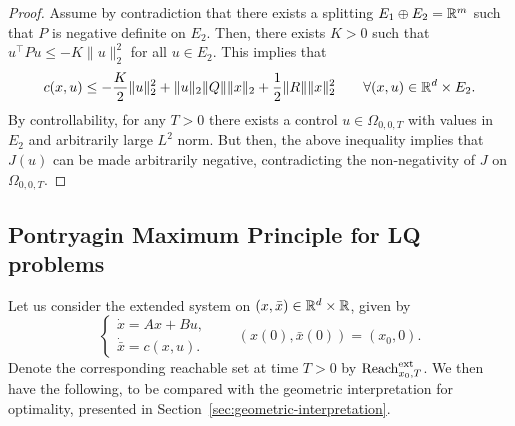 \begin{proof}
    Assume by contradiction that there exists a splitting $E_1\oplus E_2 = \mathbb{R}^m$ such that $P$ is negative definite on $E_2$.
    Then, there exists $K>0$ such that $u^\top P u \le -K \|u\|_2^2$ for all $u\in E_2$.
    This implies that 
    \begin{equation}
        c(x,u) \le -\frac{K}2 \|u\|_2^2 + \|u\|_2\|Q\|\|x\|_2 + \frac12 \|R\|\|x\|_2^2 \qquad \forall (x,u)\in \mathbb{R}^d\times E_2.
    \end{equation}
    By controllability, for any $T>0$ there exists a control $u\in \Omega_{0,0,T}$ with values in $E_2$ and arbitrarily large $L^2$ norm. 
    But then, the above inequality implies that $J(u)$ can be made arbitrarily negative, contradicting the non-negativity of $J$ on $\Omega_{0,0,T}$.
\end{proof}

\subsection{Pontryagin Maximum Principle for LQ problems}

Let us consider the extended system on $(x,\bar x)\in \mathbb{R}^d\times \mathbb{R}$, given by 
\begin{equation}
    \begin{cases}
        \dot x = Ax + B u,\\
        \dot{\bar x} = c(x,u).
    \end{cases}
    \qquad 
    (x(0),\bar x(0)) = (x_0,0).
\end{equation}
Denote the corresponding reachable set at time $T>0$ by $\operatorname{Reach}^{\text{ext}}_{x_0,T}$.
We then have the following, to be compared with the geometric interpretation for optimality, presented in Section~\ref{sec:geometric-interpretation}.


